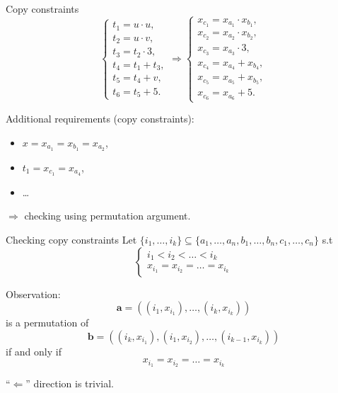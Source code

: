 \documentclass{beamer}
\begin{document}
	\begin{frame}{Copy constraints}
		\begin{equation*}
			\begin{cases}
				t_1 = u \cdot u,\\
				t_2 = u \cdot v,\\
				t_3 = t_2 \cdot 3,\\
				t_4 = t_1 + t_3,\\
				t_5 = t_4 + v,\\
				t_6 = t_5 + 5.
			\end{cases}\Rightarrow
			\begin{cases}
				x_{c_1} = x_{a_1} \cdot x_{b_1},\\
				x_{c_2} = x_{a_2} \cdot x_{b_2},\\
				x_{c_3} = x_{a_3} \cdot 3,\\
				x_{c_4} = x_{a_4} + x_{b_4},\\
				x_{c_5} = x_{a_5} + x_{b_5},\\
				x_{c_6} = x_{a_6} + 5.
			\end{cases}
		\end{equation*}
	
		Additional requirements (copy constraints):
		\begin{itemize}
			\item $x = x_{a_1} = x_{b_1} = x_{a_2}$,\\
			\item $t_1 = x_{c_1} = x_{a_4}$,\\
			\item \dots
		\end{itemize}
		$\Rightarrow$ checking using permutation argument.
	\end{frame}
	\begin{frame}{Checking copy constraints}
		Let $\{i_1, \dots, i_k\} \subseteq \{a_1, \dots, a_n, b_1, \dots, b_n, c_1, \dots, c_n\}$ s.t 
		\begin{equation*}
			\begin{cases}
				i_1 < i_2 < \dots < i_k \\
				x_{i_1} = x_{i_2} = \dots = x_{i_k}
			\end{cases}
		\end{equation*}
		
		Observation: 
		\begin{equation*}
			\mathbf{a} = \left((i_1, x_{i_1}), \dots, (i_k, x_{i_k})\right) 
		\end{equation*}
		is a permutation of 
		\begin{equation*}
			\mathbf{b} = \left((i_k, x_{i_1}), (i_1, x_{i_2}), \dots, (i_{k - 1}, x_{i_k})\right) 
		\end{equation*}
		if and only if 
		\begin{equation*}
			x_{i_1} = x_{i_2} = \dots = x_{i_k}
		\end{equation*}
	
		``$\Leftarrow$'' direction is trivial.
	\end{frame}
\end{document}
